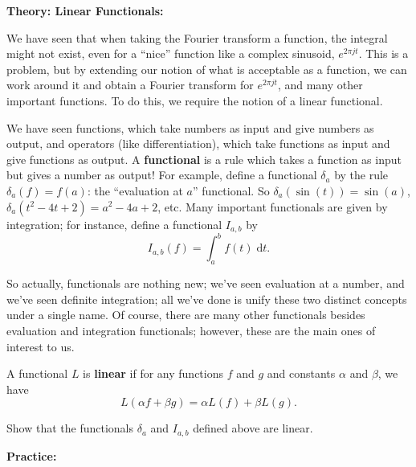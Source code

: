 \documentclass{article}
\newcommand{\diff}{\;\mathrm{d}}
\begin{document}
\clearpage












\textbf{Theory: Linear Functionals:}\bigskip


We have seen that when taking the Fourier transform a function, the integral might not exist, even for a ``nice'' function like a complex sinusoid, $e^{2\pi jt}$. This is a problem, but by extending our notion of what is acceptable as a function, we can work around it and obtain a Fourier transform for $e^{2\pi jt}$, and many other important functions. To do this, we require the notion of a linear functional.

We have seen functions, which take numbers as input and give numbers as output, and operators (like differentiation), which take functions as input and give functions as output. A \textbf{functional} is a rule which takes a function as input but gives a number as output! For example, define a functional $\delta_a$ by the rule $\delta_a(f)=f(a)$: the ``evaluation at $a$'' functional. So $\delta_a(\sin(t))=\sin(a)$, $\delta_a(t^2-4t+2)=a^2-4a+2$, etc. Many important functionals are given by integration; for instance, define a functional $I_{a,b}$ by
\[I_{a,b}(f)=\int_a^b f(t)\diff t.\]

So actually, functionals are nothing new; we've seen evaluation at a number, and we've seen definite integration; all we've done is unify these two distinct concepts under a single name. Of course, there are many other functionals besides evaluation and integration functionals; however, these are the main ones of interest to us.

A functional $L$ is \textbf{linear} if for any functions $f$ and $g$ and constants $\alpha$ and $\beta$, we have
\[L(\alpha f + \beta g)=\alpha L(f)+\beta L(g).\]

Show that the functionals $\delta_a$ and $I_{a,b}$ defined above are linear.
\vfill











\clearpage










\textbf{Practice:}\bigskip
\end{document}
